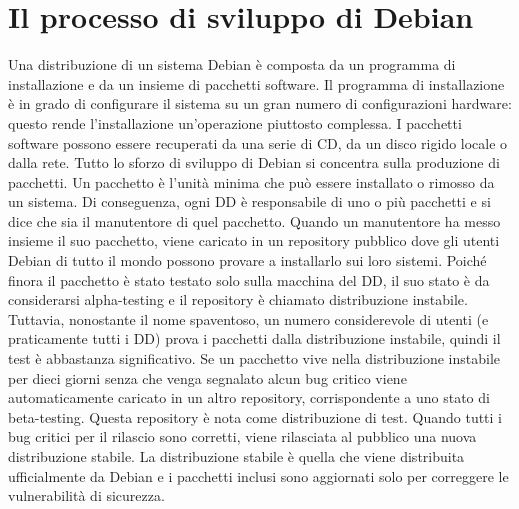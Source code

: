 \documentclass[a4paper,12pt,titlepage,oneside]{book}
\begin{document}
\section{Il processo di sviluppo di Debian}

    Una distribuzione di un sistema Debian è composta da un programma di installazione e da un insieme di pacchetti software. Il programma di
    installazione è in grado di configurare il sistema su un gran numero di configurazioni hardware:  questo rende l'installazione un'operazione piuttosto complessa. 
    I pacchetti software possono essere recuperati da una serie di CD, da un disco rigido locale o dalla rete. Tutto lo sforzo di sviluppo di Debian si concentra sulla produzione di pacchetti.
    Un pacchetto è l'unità minima che può essere installato o rimosso da un sistema. Di conseguenza, ogni DD è responsabile di uno o più pacchetti e si dice che sia il manutentore di quel 
    pacchetto.
    Quando un manutentore ha messo insieme il suo pacchetto, viene caricato in un repository pubblico dove gli utenti Debian di tutto il mondo possono provare a installarlo sui loro sistemi. 
    Poiché finora il pacchetto è stato testato solo sulla macchina del DD, il suo stato è da considerarsi alpha-testing e il repository è chiamato distribuzione instabile. Tuttavia, nonostante il nome spaventoso,
    un numero considerevole di utenti (e praticamente tutti i DD) prova i pacchetti dalla distribuzione instabile, quindi il test è abbastanza significativo. Se un pacchetto vive nella distribuzione
    instabile per dieci giorni senza che venga segnalato alcun bug critico viene automaticamente caricato in un altro repository, corrispondente a uno stato di beta-testing.
    Questa repository è nota come distribuzione di test. Quando tutti i bug critici per il rilascio sono corretti, viene rilasciata al pubblico una nuova distribuzione stabile.
    La distribuzione stabile è quella che viene distribuita ufficialmente da Debian e i pacchetti inclusi sono aggiornati solo per correggere le vulnerabilità di sicurezza.
\end{document}
